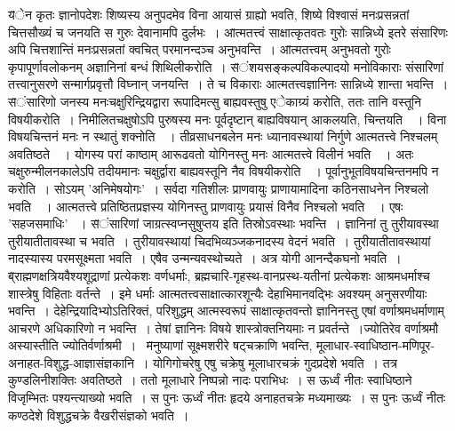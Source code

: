 {\fontsize{14}{16}\selectfont \v  येन कृतः ज्ञानोपदेशः शिष्यस्य अनुपदमेव विना आयासं ग्राह्यो भवति, शिष्ये विश्वासं मनःप्रसन्नतां चित्तसौख्यं च जनयति स गुरुः देवानामपि दुर्लभः~।}
{\fontsize{14}{16}\selectfont \v  आत्मतत्त्वं साक्षात्कृतवतः गुरोः सान्निध्ये इतरे संसारिणः अपि चित्तशान्तिं मनःप्रसन्नतां क्वचित् परमानन्दञ्च अनुभवन्ति~।}
{\fontsize{14}{16}\selectfont \v  आत्मतत्त्वम् अनुभवतो गुरोः कृपापूर्णावलोकनम्  अज्ञानिनां बन्धं शिथिलीकरोति~।}
{\fontsize{14}{16}\selectfont \v  संशयसङ्कल्पविकल्पादयो मनोविकाराः संसारिणां तत्त्वानुसरणे सन्मार्गप्रवृत्तौ विघ्नान् जनयन्ति~। ते च विकाराः आत्मतत्त्वज्ञानिनः सान्निध्ये शान्ता भवन्ति~।}
{\fontsize{14}{16}\selectfont \v  संसारिणो जनस्य मनःचक्षुरिन्द्रियद्वारा  रूपादिमत्सु बाह्यवस्तुषु एेकाग्र्यं करोति, ततः तानि वस्तूनि विषयीकरोति~। निमीलितचक्षुषोऽपि पुरुषस्य मनः पूर्वदृष्टान् बाह्यविषयान् आकलयति, चिन्तयति~~। विना विषयचिन्तनं मनः न स्थातुं शक्नोति~~। तीव्रसाधनबलेन मनः ध्यानावस्थायां निर्गुणे आत्मतत्त्वे निश्चलम् अवतिष्ठते~~। योगस्य परां काष्ठाम् आरूढवतो योगिनस्तु मनः आत्मतत्त्वे विलीनं भवति~~। अतः  चक्षुरुन्मीलनकालेऽपि तदीयमानः चक्षुर्द्वारा बाह्यवस्तूनि नैव विषयीकरोति~~।  पूर्वानुभूतविषयचिन्तनमपि न करोति~। सोऽयम् 'अनिमेषयोगः'~। सर्वदा गतिशीलः प्राणवायुः प्राणायामादिना कठिनसाधनेन निश्चलो भवति~~। आत्मतत्त्वे प्रतिष्ठितप्रज्ञस्य योगिनस्तु प्राणवायुः प्रयासं विनैव निश्चलो भवति~~। एषः 'सहजसमाधिः' ~।}
{\fontsize{14}{16}\selectfont \v  संसारिणां जाग्रत्स्वप्नसुषुप्तय इति तिस्रोऽवस्थाः भवन्ति~। ज्ञानिनां तु तुरीयावस्था तुरीयातीतावस्था च भवति~। तुरीयावस्थायां चिदभिव्यञ्जकनादस्य वेदनं भवति~। तुरीयातीतावस्थायां नादस्यास्य परमसूक्ष्मता भवति~। एषैव उन्मन्यवस्थोच्यते~। अत्र योगी आनन्दैकघनो भवति~।\footB \ }
{\fontsize{14}{16}\selectfont \v  ब्राह्मणक्षत्रियवैश्यशूद्राणां प्रत्येकशः वर्णधर्माः, ब्रह्मचारि-गृहस्थ-वानप्रस्थ-यतीनां प्रत्येकशः आश्रमधर्माश्च शास्त्रेषु विहिताः वर्तन्ते~। इमे धर्माः आत्मतत्त्वसाक्षात्कारशून्यैः देहाभिमानवद्भिः अवश्यम् अनुसरणीयाः भवन्ति~। देहेन्द्रियादिभ्योऽतिरिक्तं, परिशुद्धम् आत्मस्वरूपं साक्षात्कृतवन्तो ज्ञानिनस्तु एषां वर्णाश्रमधर्माणाम् आचरणे अधिकारिणो न भवन्ति~। तेषां ज्ञानिनः विषये शास्त्रोक्तनियमाः न प्रवर्तन्ते~।ज्योतिरेव वर्णाश्रमौ अस्यास्तीति ज्योतिर्वर्णाश्रमी~।\footB \  }
{\fontsize{14}{16}\selectfont \v  मनुष्याणां सूक्ष्मशरीरे षट्चक्राणि भवन्ति, मूलाधार-स्वाधिष्ठान-मणिपूर-अनाहत-विशुद्ध-आज्ञासंज्ञकानि~। योगिगोचरेषु एषु चक्रेषु मूलाधारचक्रं गुदप्रदेशे भवति~। तत्र कुण्डलिनीशक्तिः अवतिष्ठते~। ततो मूलाधारे निष्पन्नो नादः पराभिधः~। स ऊर्ध्वं नीतः स्वाधिष्ठाने विजृम्भितः पश्यन्त्याख्यो भवति~। स पुनः ऊर्ध्वं नीतः हृदये अनाहतचक्रे मध्यमाख्यः~। स पुनः ऊर्ध्वं नीतः कण्ठदेशे विशुद्धचक्रे वैखरीसंज्ञको भवति~।}
